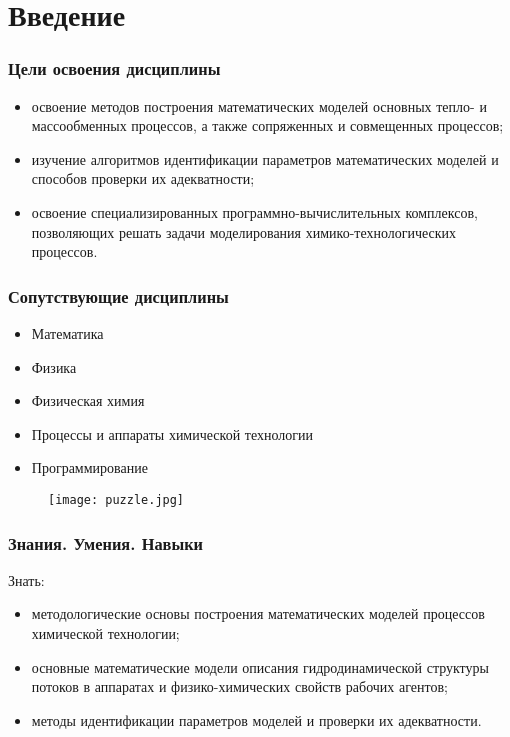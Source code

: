 \section{Введение}

\begin{frame}
\frametitle{Цели освоения дисциплины}
	\begin{itemize}
		\item освоение методов построения математических моделей основных тепло- и массообменных процессов, а также сопряженных и совмещенных процессов; 
		\item изучение алгоритмов идентификации параметров математических моделей и способов проверки их адекватности; 
		\item освоение специализированных программно-вычислительных комплексов, позволяющих решать задачи моделирования химико-технологических процессов.
	\end{itemize}
\end{frame}

\begin{frame}
\frametitle{Сопутствующие дисциплины}
	\begin{itemize}
		\item Математика
		\item Физика
		\item Физическая химия
		\item Процессы и аппараты химической технологии
		\item Программирование
	\end{itemize}
	\begin{figure}[h]
		\texttt{[image: puzzle.jpg]}
	\end{figure}
\end{frame}

\begin{frame}
	\frametitle{Знания. Умения. Навыки}
	 Знать:
			\begin{itemize}
				\item методологические основы построения математических моделей процессов химической технологии;
				\item основные математические модели описания гидродинамической структуры потоков в аппаратах и физико-химических свойств рабочих агентов;
				\item методы идентификации параметров моделей и проверки их адекватности.
			\end{itemize}
	 
\end{frame}


